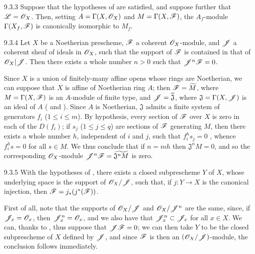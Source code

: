 \documentclass[10pt,oneside]{book}
\begin{document}
\begin{envs}[Corollary]{9.3.3}
\label{cor-1.9.3.3}
Suppose that the hypotheses of  are satisfied, and suppose further that
$\mathscr{L}=\mathscr{O}_X$. Then, setting $A=\Gamma(X,\mathscr{O}_X)$ and $M=\Gamma(X,\mathscr{F})$, the $A_f$-module
$\Gamma(X_f,\mathscr{F})$ is canonically isomorphic to $M_f$.
\end{envs}

\begin{envs}[Proposition]{9.3.4}
\label{prop-1.9.3.4}
Let $X$ be a Noetherian prescheme, $\mathscr{F}$ a coherent $\mathscr{O}_X$-module, and $\mathscr{J}$ a
coherent sheaf of ideals in $\mathscr{O}_X$, such that the support of $\mathscr{F}$ is contained in that
of $\mathscr{O}_X|\mathscr{J}$. Then there exists a whole number $n>0$ such that $\mathscr{J}^n\mathscr{F}=0$.
\end{envs}

Since $X$ is a union of finitely-many affine opens whose rings are Noetherian, we can suppose
that $X$ is affine of Noetherian ring $A$; then $\mathscr{F}=\widetilde{M}$, where
$M=\Gamma(X,\mathscr{F})$ is an $A$-module of finite type, and $\mathscr{J}=\widetilde{\mathfrak{J}}$,
where $\mathfrak{J}=\Gamma(X,\mathscr{J})$ is an ideal of $A$ ( and
). Since $A$ is Noetherian, $\mathfrak{J}$ admits a finite system of
generators $f_i$ ($1\leqslant i\leqslant m$). By hypothesis, every section of $\mathscr{F}$ over
$X$ is zero in each of the $D(f_i)$; if $s_j$ ($1\leqslant j\leqslant q$) are sections of
$\mathscr{F}$ generating $M$, then there exists a whole number $h$, independent of $i$ and $j$,
such that $f_i^h s_j=0$ , whence $f_i^h s=0$ for all $s\in M$. We thus
conclude that if $n=mh$ then $\mathfrak{J}^n M=0$, and so the corresponding $\mathscr{O}_X$-module
$\mathscr{J}^n\mathscr{F}=\widetilde{\mathfrak{J}^n M}$  is zero.

\begin{envs}[Corollary]{9.3.5}
\label{cor-1.9.3.5}
With the hypotheses of , there exists a closed subprescheme $Y$ of $X$,
whose underlying space is the support of $\mathscr{O}_X/\mathscr{J}$, such that, if $j:Y\to X$ is the
canonical injection, then $\mathscr{F}=j_*(j^*(\mathscr{F}))$.
\end{envs}

First of all, note that the supports of $\mathscr{O}_X/\mathscr{J}$ and $\mathscr{O}_X/\mathscr{J}^n$ are the same,
since, if $\mathscr{J}_x=\mathscr{O}_x$, then $\mathscr{J}_x^n=\mathscr{O}_x$, and we also have that
$\mathscr{J}_x^n\subset\mathscr{J}_x$ for all $x\in X$. We can, thanks to , thus
suppose that $\mathscr{J}\mathscr{F}=0$; we can then take $Y$ to be the closed subprescheme of $X$
defined by $\mathscr{J}$, and since $\mathscr{F}$ is then an $(\mathscr{O}_X/\mathscr{J})$-module, the conclusion
follows immediately.
\end{document}
